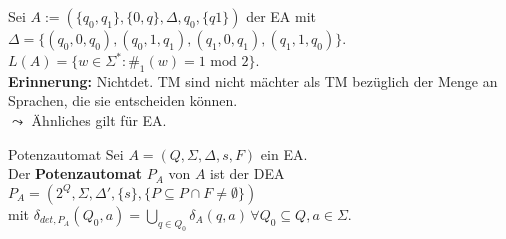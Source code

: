 \begin{exam}
    Sei $A := (\{q_0,q_1\},\{0,q\},\Delta,q_0,\{q1\})$ der EA mit \\
    $\Delta = \{(q_0,0,q_0),(q_0,1,q_1),(q_1,0,q_1),(q_1,1,q_0)\}$. \\


    $L(A) = \{w \in \Sigma^* : \#_1(w) = 1 \text{ mod } 2\}$. \\

    \textbf{Erinnerung:} Nichtdet. TM sind nicht mächter als TM bezüglich der Menge an Sprachen, die sie entscheiden können.\\


    $\leadsto$ Ähnliches gilt für EA.
\end{exam}

\begin{defn}{Potenzautomat}
        Sei $A = (Q,\Sigma,\Delta,s,F)$ ein EA. \\

        Der \textbf{Potenzautomat} $P_A$ von $A$ ist der DEA \\
        $P_A = (2^Q, \Sigma, \Delta', \{s\},\{P \subseteq P \cap F \neq \emptyset\})$ \\
        mit $\delta_{det,P_A}(Q_0,a) = \bigcup\limits_{q \in Q_0} \delta_A(q,a) \, \forall Q_0 \subseteq Q, a \in \Sigma$.
\end{defn}

